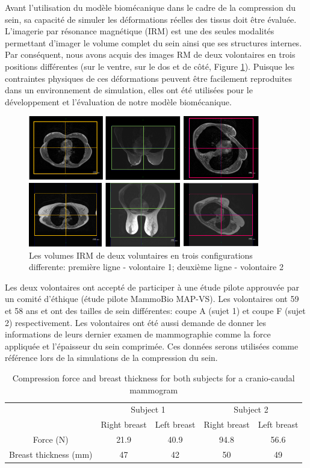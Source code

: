 Avant l'utilisation du modèle biomécanique dans le cadre de la compression du sein, sa capacité de simuler les déformations réelles des tissus doit être évaluée. L'imagerie par résonance magnétique (IRM) est une des seules modalités permettant d'imager le volume complet du sein ainsi que ses structures internes. Par conséquent, nous avons acquis des images RM de deux volontaires en trois positions différentes (sur le ventre, sur le dos et de côté,  Figure \ref{fig:donneespatient}).  Puisque les contraintes physiques de ces déformations peuvent être facilement reproduites dans un environnement de simulation, elles ont été utilisées pour le développement et l'évaluation de notre modèle biomécanique.     

\begin{figure}[!h]
\centering
\includegraphics[width=0.9\textwidth,keepaspectratio]{figures/patientData.png} 
\caption{Les volumes IRM de deux voluntaires en trois configurations differente: première ligne - volontaire 1; deuxième ligne - volontaire 2}\label{fig:donneespatient}
\end{figure}


Les deux volontaires ont accepté de participer à une étude pilote approuvée par un comité d'éthique (étude pilote MammoBio MAP-VS). Les volontaires ont 59 et 58 ans et ont des tailles de sein différentes: coupe A (sujet 1) et coupe F (sujet 2) respectivement. Les volontaires ont été aussi demande de donner les informations de leurs dernier examen de mammographie comme la force appliquée et l'épaisseur du sein comprimée. Ces données serons utilisées comme référence lors de la simulations de la compression du sein. 
\begin{table}[!h]
\centering
\begin{tabular}{c|c|c||c|c|}
\cline{2-5}
&\multicolumn{2}{c||}{Subject 1}&\multicolumn{2}{c|}{Subject 2}\\
\cline{2-5}
& Right breast & Left breast & Right breast & Left breast\\
\cline{2-5}
\hline
\multicolumn{1}{|c||}{Force (N)}  & 21.9 &40.9 &94.8 & 56.6 \\
\hline
\multicolumn{1}{|c||}{ Breast thickness (mm)} & 47 & 42 & 50 & 49 \\
\hline

\end{tabular}
\caption{Compression force and breast thickness for both subjects for a cranio-caudal mammogram}\label{tab:forceandthichnessdata}
\end{table}

